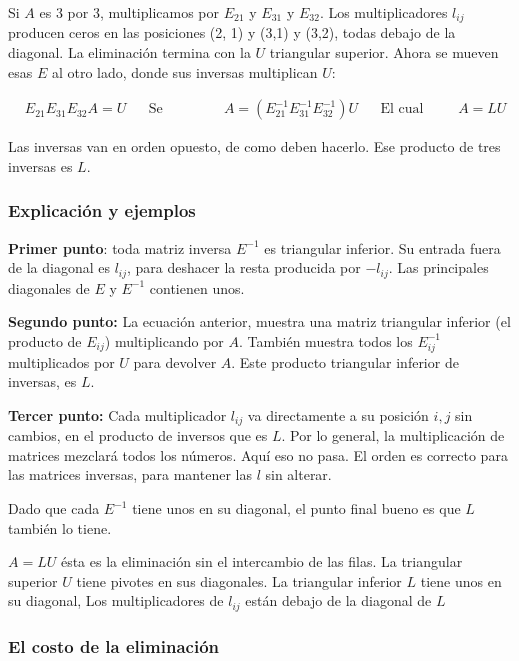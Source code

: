 Si $A$ es 3 por 3, multiplicamos por $E_{21}$ y $E_{31}$ y $E_{32}$. Los multiplicadores $l_{ij}$ producen
ceros en las posiciones (2, 1) y (3,1) y (3,2), todas debajo de la diagonal. La eliminación termina
con la $U$ triangular superior. Ahora se mueven esas $E$ al otro lado, donde sus inversas multiplican $U$:

\begin{align*}
	 & E_{21}E_{31}E_{32}A=U &  & \text{Se vuelve} &  & A=\left(E^{-1}_{21}E^{-1}_{31}E^{-1}_{32}\right)U &  & \text{El cual es } &  & A=LU
\end{align*}

Las inversas van en orden opuesto, de como deben hacerlo. Ese producto de tres inversas es $L$.

\subsubsection{Explicación y ejemplos}

\textbf{Primer punto}: toda matriz inversa $E^{-1}$ es triangular inferior. Su entrada fuera de la diagonal es $l_{ij}$,
para deshacer la resta producida por $-l_{ij}$. Las principales diagonales de $E$ y $E^{-1}$ contienen unos.

\textbf{Segundo punto:} La ecuación anterior, muestra una matriz triangular inferior (el producto de $E_{ij}$)
multiplicando por $A$. También muestra todos los $E^{-1}_{ij}$ multiplicados por $U$ para devolver $A$.
Este producto triangular inferior de inversas, es $L$.

\textbf{Tercer punto:} Cada multiplicador $l_{ij}$ va directamente a su posición $i, j$ sin cambios, en el
producto de inversos que es $L$. Por lo general, la multiplicación de matrices mezclará todos los números.
Aquí eso no pasa. El orden es correcto para las matrices inversas, para mantener las $l$
sin alterar.

Dado que cada $E^{-1}$ tiene unos en su diagonal, el punto final bueno es que $L$ también lo tiene.

\begin{remark}
	$A=LU$ ésta es la eliminación sin el intercambio de las filas. La triangular superior $U$
	tiene pivotes en sus diagonales. La triangular inferior $L$ tiene unos en su diagonal, Los
	multiplicadores de $l_{ij}$ están debajo de la diagonal de $L$
\end{remark}

\subsubsection{El costo de la eliminación}


